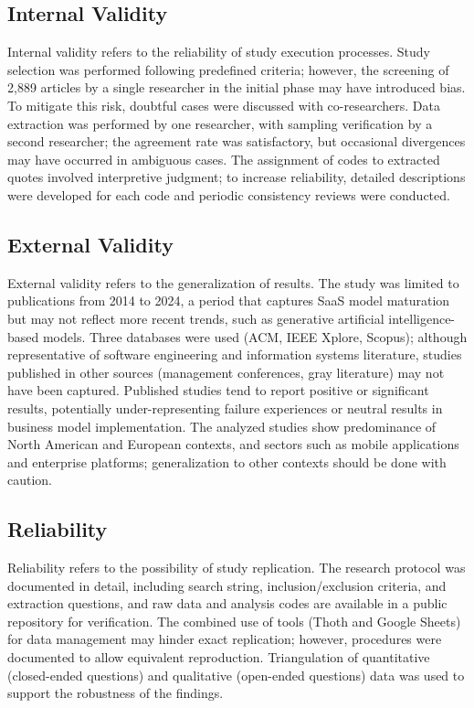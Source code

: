 \documentclass[journal]{IEEEtran}
\begin{document}
\subsection{Internal Validity}

Internal validity refers to the reliability of study execution processes.
Study selection was performed following predefined criteria; however, the screening of 2,889 articles by a single researcher in the initial phase may have introduced bias.
To mitigate this risk, doubtful cases were discussed with co-researchers.
Data extraction was performed by one researcher, with sampling verification by a second researcher; the agreement rate was satisfactory, but occasional divergences may have occurred in ambiguous cases.
The assignment of codes to extracted quotes involved interpretive judgment; to increase reliability, detailed descriptions were developed for each code and periodic consistency reviews were conducted.

\subsection{External Validity}

External validity refers to the generalization of results.
The study was limited to publications from 2014 to 2024, a period that captures SaaS model maturation but may not reflect more recent trends, such as generative artificial intelligence-based models.
Three databases were used (ACM, IEEE Xplore, Scopus); although representative of software engineering and information systems literature, studies published in other sources (management conferences, gray literature) may not have been captured.
Published studies tend to report positive or significant results, potentially under-representing failure experiences or neutral results in business model implementation.
The analyzed studies show predominance of North American and European contexts, and sectors such as mobile applications and enterprise platforms; generalization to other contexts should be done with caution.

\subsection{Reliability}

Reliability refers to the possibility of study replication.
The research protocol was documented in detail, including search string, inclusion/exclusion criteria, and extraction questions, and raw data and analysis codes are available in a public repository for verification.
The combined use of tools (Thoth and Google Sheets) for data management may hinder exact replication; however, procedures were documented to allow equivalent reproduction.
Triangulation of quantitative (closed-ended questions) and qualitative (open-ended questions) data was used to support the robustness of the findings.
\end{document}
